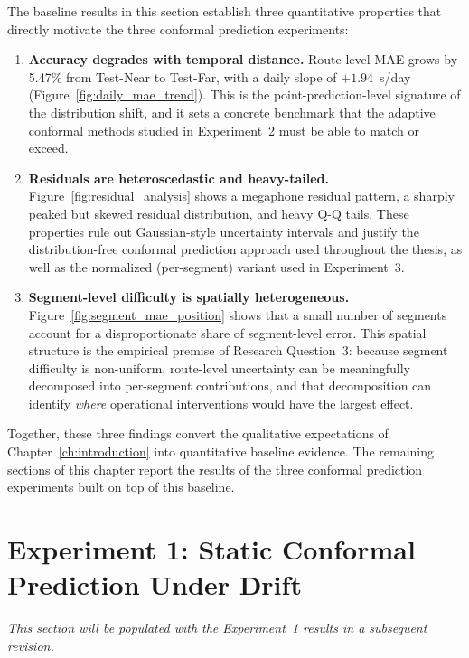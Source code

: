 The baseline results in this section establish three quantitative properties that directly motivate the three conformal prediction experiments:

\begin{enumerate}
    \item \textbf{Accuracy degrades with temporal distance.} Route-level MAE grows by 5.47\% from Test-Near to Test-Far, with a daily slope of $+1.94$~s/day (Figure~\ref{fig:daily_mae_trend}). This is the point-prediction-level signature of the distribution shift, and it sets a concrete benchmark that the adaptive conformal methods studied in Experiment~2 must be able to match or exceed.
    \item \textbf{Residuals are heteroscedastic and heavy-tailed.} Figure~\ref{fig:residual_analysis} shows a megaphone residual pattern, a sharply peaked but skewed residual distribution, and heavy Q-Q tails. These properties rule out Gaussian-style uncertainty intervals and justify the distribution-free conformal prediction approach used throughout the thesis, as well as the normalized (per-segment) variant used in Experiment~3.
    \item \textbf{Segment-level difficulty is spatially heterogeneous.} Figure~\ref{fig:segment_mae_position} shows that a small number of segments account for a disproportionate share of segment-level error. This spatial structure is the empirical premise of Research Question~3: because segment difficulty is non-uniform, route-level uncertainty can be meaningfully decomposed into per-segment contributions, and that decomposition can identify \emph{where} operational interventions would have the largest effect.
\end{enumerate}

Together, these three findings convert the qualitative expectations of Chapter~\ref{ch:introduction} into quantitative baseline evidence. The remaining sections of this chapter report the results of the three conformal prediction experiments built on top of this baseline.

\section{Experiment 1: Static Conformal Prediction Under Drift}
\label{sec:exp1_results}

\textit{This section will be populated with the Experiment~1 results in a subsequent revision.}

